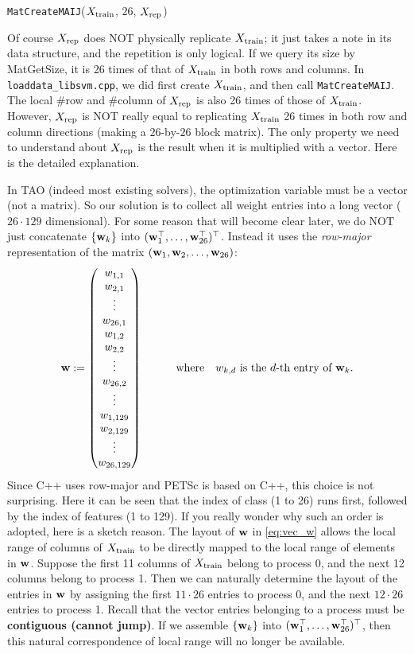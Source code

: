\documentclass[11pt]{report}
\begin{document}
\verb!MatCreateMAIJ!($X_{\text{train}}$, 26, $X_{\text{rep}}$)

Of course $X_{\text{rep}}$ does NOT physically replicate $X_{\text{train}}$;
it just takes a note in its data structure, and the repetition is only logical.
If we query its size by MatGetSize, it is 26 times of that of $X_{\text{train}}$ in both rows and columns.
In \verb!loaddata_libsvm.cpp!, we did first create $X_{\text{train}}$, and then call \verb!MatCreateMAIJ!.
The local \#row and \#column of $X_{\text{rep}}$ is also 26 times of those of $X_{\text{train}}$.
However, $X_{\text{rep}}$ is NOT really equal to replicating $X_{\text{train}}$ 26 times in both row and column directions
(making a $26$-by-$26$ block matrix).
The only property we need to understand about $X_{\text{rep}}$ is the result when it is multiplied with a vector.
Here is the detailed explanation.

In TAO (indeed most existing solvers), the optimization variable must be a vector (not a matrix).
So our solution is to collect all weight entries into a long vector ($26 \cdot 129$ dimensional).
For some reason that will become clear later, we do NOT just concatenate $\{\mathbf{\boldsymbol{w}}_k\}$ into
$(\mathbf{\boldsymbol{w}}_1^\top, \ldots, \mathbf{\boldsymbol{w}}_{26}^\top)^\top$.
Instead it uses the \emph{row-major} representation of the matrix $(\mathbf{\boldsymbol{w}}_1, \mathbf{\boldsymbol{w}}_2, \ldots, \mathbf{\boldsymbol{w}}_{26})$:
%
\begin{align}
\label{eq:vec_w}
  \mathbf{\boldsymbol{w}} := \begin{pmatrix}
    w_{1,1} \\ w_{2,1} \\ \vdots \\ w_{26, 1} \\
    w_{1,2} \\ w_{2,2} \\ \vdots \\ w_{26, 2} \\
    \vdots \\
    w_{1,129} \\ w_{2,129} \\ \vdots \\ w_{26, 129}
  \end{pmatrix}
  \qquad
  {\quad \text{where} \quad} w_{k,d} \text{ is the } d\text{-th entry of } \mathbf{\boldsymbol{w}}_k.
\end{align}
%
Since C++ uses row-major and PETSc is based on C++,
this choice is not surprising.
Here it can be seen that the index of class (1 to 26) runs first,
followed by the index of features (1 to 129).
If you really wonder why such an order is adopted, here is a sketch reason.
The layout of $\mathbf{\boldsymbol{w}}$ in \eqref{eq:vec_w} allows the local range of columns of $X_{\text{train}}$ to be directly mapped to the local range of elements in $\mathbf{\boldsymbol{w}}$.
Suppose the first 11 columns of $X_{\text{train}}$ belong to process 0, and the next 12 columns belong to process 1.
Then we can naturally determine the layout of the entries in $\mathbf{\boldsymbol{w}}$ by
assigning the first $11 \cdot 26$ entries to process 0,
and the next $12 \cdot 26$ entries to process 1.
Recall that the vector entries belonging to a process must be {\bf contiguous (cannot jump)}.
If we assemble $\{\mathbf{\boldsymbol{w}}_k\}$ into $(\mathbf{\boldsymbol{w}}_1^\top, \ldots, \mathbf{\boldsymbol{w}}_{26}^\top)^\top$,
then this natural correspondence of local range will no longer be available.
\end{document}
